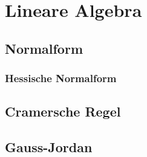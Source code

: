 \chapter{Lineare Algebra}
\section{Normalform}
\subsection{Hessische Normalform}
\section{Cramersche Regel}
\section{Gauss-Jordan}